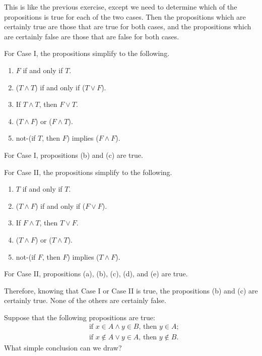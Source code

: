 \begin{solution}
This is like the previous exercise, except we need to determine which of the propositions is true
for each of the two cases. Then the propositions which are certainly true are those that are true for both cases,
and the propositions which are certainly false are those that are false for both cases.

For Case I, the propositions simplify to the following.

\begin{enumerate}[label=(\alph*)]
    \item $F$ if and only if $T$.
    \item ($T\land T$) if and only if ($T\lor F$).
    \item If $T\land T$, then $F\lor T$.
    \item ($T\land F$) or ($F\land T$).
    \item not-(if $T$, then $F$) implies ($F\land F$).
\end{enumerate}

For Case I, propositions (b) and (c) are true.

For Case II, the propositions simplify to the following.

\begin{enumerate}[label=(\alph*)]
    \item $T$ if and only if $T$.
    \item ($T\land F$) if and only if ($F\lor F$).
    \item If $F\land T$, then $T\lor F$.
    \item ($T\land F$) or ($T\land T$).
    \item not-(if $F$, then $F$) implies ($T\land F$).
\end{enumerate}

For Case II, propositions (a), (b), (c), (d), and (e) are true.

Therefore, knowing that Case I or Case II is true,
the propositions (b) and (c) are certainly true. None of the others are certainly false.
\end{solution}

\begin{exercise}
Suppose that the following propositions are true:
\begin{align*}
    &\text{if $x\in A\land y\in B$, then $y\in A$;}\\
    &\text{if $x\nin A\lor y\in A$, then $y\nin B$.}
\end{align*}
What simple conclusion can we draw?
\end{exercise}

